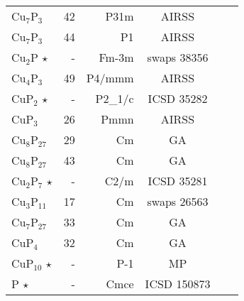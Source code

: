 \begin{tabular}{l r r c l l}
  Cu$_\text{7}$P$_\text{3}$               &          42          &         P31m         &             AIRSS              &                                \\
  Cu$_\text{7}$P$_\text{3}$               &          44          &          P1          &             AIRSS              &                                \\
        Cu$_\text{2}$P          $\star$   &          -           &       Fm-3m         &          swaps 38356           &                                \\
  Cu$_\text{4}$P$_\text{3}$               &          49          &        P4/mmm        &             AIRSS              &                                \\
        CuP$_\text{2}$          $\star$   &          -           &       P2_1/c        &           ICSD 35282           &                                \\
        CuP$_\text{3}$                    &          26          &         Pmmn         &             AIRSS              &                                \\
  Cu$_\text{8}$P$_\text{27}$              &          29          &          Cm          &               GA               &                                \\
  Cu$_\text{8}$P$_\text{27}$              &          43          &          Cm          &               GA               &                                \\
  Cu$_\text{2}$P$_\text{7}$     $\star$   &          -           &        C2/m         &           ICSD 35281           &                                \\
  Cu$_\text{3}$P$_\text{11}$              &          17          &          Cm          &          swaps 26563           &                                \\
  Cu$_\text{7}$P$_\text{27}$              &          33          &          Cm          &               GA               &                                \\
        CuP$_\text{4}$                    &          32          &          Cm          &               GA               &                                \\
       CuP$_\text{10}$          $\star$   &          -           &        P-1          &               MP               &                                \\
              P                 $\star$   &          -           &        Cmce         &          ICSD 150873           &                                \\
\end{tabular}